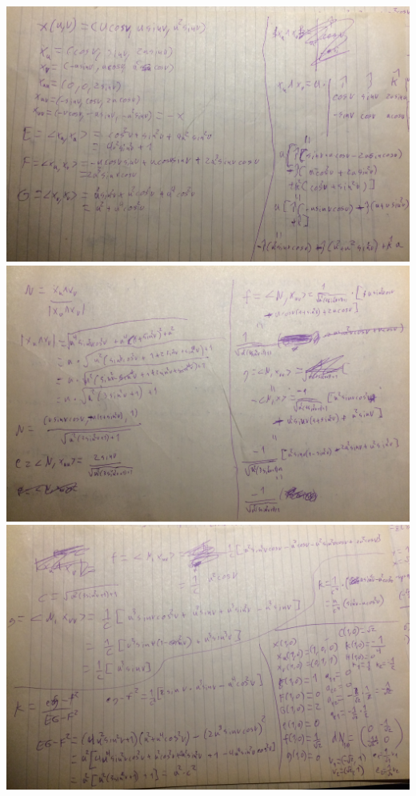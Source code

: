 \includegraphics{img/IMG_5982.JPG}
\includegraphics{img/IMG_5983.JPG}
\includegraphics{img/IMG_5984.JPG}
